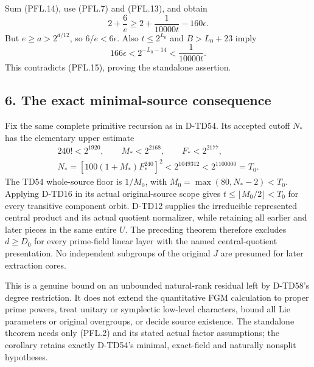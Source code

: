 Sum (PFL.14), use (PFL.7) and (PFL.13), and obtain
\[
           2+\frac6e\ge2+\frac1{10000t}-160\epsilon.
 \tag{PFL.15}
\]
But \(e\ge a>2^{d/12}\), so \(6/e<6\epsilon\). Also
\(t\le2^{L_0}\) and \(B>L_0+23\) imply
\[
             166\epsilon<2^{-L_0-14}
                            <\frac1{10000t}.
 \tag{PFL.16}
\]
This contradicts (PFL.15), proving the standalone assertion.

\subsection*{6. The exact minimal-source consequence}

Fix the same complete primitive recursion as in D-TD54.
Its accepted cutoff \(N_*\) has the elementary upper estimate
\[
 \begin{gathered}
 240!<2^{1920},\qquad M_*<2^{2168},\qquad F_*<2^{2177},\\
 N_*=[100(1+M_*)F_*^{240}]^2
                <2^{1049312}<2^{1100000}=T_0.
 \end{gathered}
 \tag{PFL.17}
\]
The TD54 whole-source floor is \(1/M_0\), with
\(M_0=\max(80,N_*-2)<T_0\). Applying D-TD16 in its actual
original-source scope gives \(t\le\lfloor M_0/2\rfloor<T_0\)
for every transitive component orbit. D-TD12 supplies the
irreducible represented central product and its actual quotient
normalizer, while retaining all earlier and later pieces in
the same entire \(U\). The preceding theorem therefore excludes
\(d\ge D_0\) for every prime-field linear layer with the named
central-quotient presentation. No independent subgroups of the
original \(J\) are presumed for later extraction cores.

This is a genuine bound on an unbounded natural-rank residual
left by D-TD58's degree restriction. It does not extend the
quantitative FGM calculation to proper prime powers, treat
unitary or symplectic low-level characters, bound all Lie
parameters or original overgroups, or decide source existence.
The standalone theorem needs only (PFL.2) and its stated actual
factor assumptions; the corollary retains exactly D-TD54's
minimal, exact-field and naturally nonsplit hypotheses.

